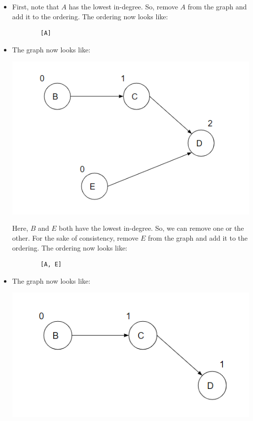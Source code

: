 \documentclass[letterpaper]{article}
\begin{document}
\begin{itemize}
    \item First, note that $A$ has the lowest in-degree. So, remove $A$ from the graph and add it to the ordering. The ordering now looks like: 
    \begin{verbatim}
        [A]
    \end{verbatim}
    \item The graph now looks like: 
    \begin{center}
        \includegraphics[scale=0.4]{../assets/dag_ex_deg_2.png}
    \end{center}
    Here, $B$ and $E$ both have the lowest in-degree. So, we can remove one or the other. For the sake of consistency, remove $E$ from the graph and add it to the ordering. The ordering now looks like: 
    \begin{verbatim}
        [A, E]
    \end{verbatim}
    \item The graph now looks like:
    \begin{center}
        \includegraphics[scale=0.4]{../assets/dag_ex_deg_3.png}

\end{center}
\end{itemize}
\end{document}
